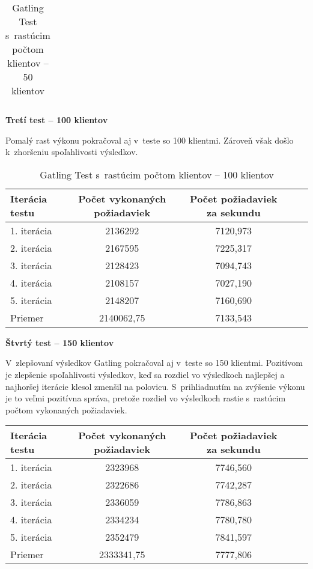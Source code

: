 \documentclass[12pt,oneside,final]{fithesis-utf8}
\begin{document}
\begin{itemize}
\begin{table}[H]
\begin{center}
\begin{tabular}{ | l | c | c | c | c |}
\end{tabular}
\end{center}
\caption{Gatling Test s~rastúcim počtom klientov -- 50 klientov}
\end{table}


\textbf{Tretí test -- 100 klientov}

Pomalý rast výkonu pokračoval aj v~teste so 100 klientmi. Zároveň však došlo k~zhoršeniu spoľahlivosti výsledkov.

\begin{table}[H]
\begin{center}
\begin{tabular}{ | l | c | c | c | c |}
		\hline
		 \textbf{Iterácia testu} & \textbf{Počet vykonaných požiadaviek} & \textbf{Počet požiadaviek za sekundu} \\ \hline
		 1. iterácia & 2136292 & 7120,973 \\ \hline
		 2. iterácia & 2167595 & 7225,317 \\ \hline
		 3. iterácia & 2128423 & 7094,743 \\ \hline
		 4. iterácia & 2108157 & 7027,190 \\ \hline
		 5. iterácia & 2148207 & 7160,690 \\ \hline
		 Priemer & 2140062,75 & 7133,543 \\ \hline
		 
\end{tabular}
\end{center}
\caption{Gatling Test s~rastúcim počtom klientov -- 100 klientov}
\end{table}


\textbf{Štvrtý test -- 150 klientov}

V~zlepšovaní výsledkov Gatling pokračoval aj v~teste so 150 klientmi. Pozitívom je zlepšenie spoľahlivosti výsledkov, keď sa rozdiel vo výsledkoch najlepšej a najhoršej iterácie klesol zmenšil na polovicu. S~prihliadnutím na zvýšenie výkonu je to veľmi pozitívna správa, pretože rozdiel vo výsledkoch rastie s~rastúcim počtom vykonaných požiadaviek.

\begin{table}[H]
\begin{center}
\begin{tabular}{ | l | c | c | c | c |}
		\hline
		 \textbf{Iterácia testu} & \textbf{Počet vykonaných požiadaviek} & \textbf{Počet požiadaviek za sekundu} \\ \hline
		 1. iterácia & 2323968 & 7746,560 \\ \hline
		 2. iterácia & 2322686 & 7742,287 \\ \hline
		 3. iterácia & 2336059 & 7786,863 \\ \hline
		 4. iterácia & 2334234 & 7780,780 \\ \hline
		 5. iterácia & 2352479 & 7841,597 \\ \hline
		 Priemer & 2333341,75 & 7777,806 \\ \hline
		 

\end{tabular}
\end{center}
\end{table}
\end{itemize}
\end{document}
